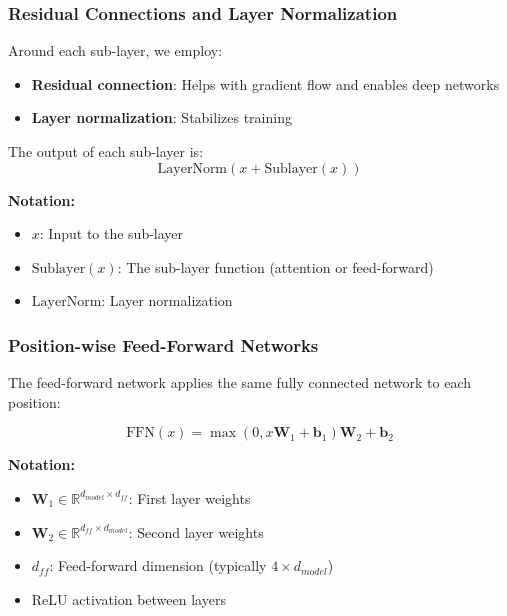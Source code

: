 \subsubsection{Residual Connections and Layer Normalization}

Around each sub-layer, we employ:
\begin{itemize}
    \item \textbf{Residual connection}: Helps with gradient flow and enables deep networks
    \item \textbf{Layer normalization}: Stabilizes training
\end{itemize}

The output of each sub-layer is:
\begin{equation}
\text{LayerNorm}(x + \text{Sublayer}(x))
\end{equation}
\begin{notationbox}
\textbf{Notation:}
\begin{itemize}
    \item $x$: Input to the sub-layer
    \item $\text{Sublayer}(x)$: The sub-layer function (attention or feed-forward)
    \item $\text{LayerNorm}$: Layer normalization
\end{itemize}
\end{notationbox}

\subsubsection{Position-wise Feed-Forward Networks}

The feed-forward network applies the same fully connected network to each position:

\begin{equation}
\text{FFN}(x) = \max(0, x\mathbf{W}_1 + \mathbf{b}_1)\mathbf{W}_2 + \mathbf{b}_2
\end{equation}
\begin{notationbox}
\textbf{Notation:}
\begin{itemize}
    \item $\mathbf{W}_1 \in \mathbb{R}^{d_{model} \times d_{ff}}$: First layer weights
    \item $\mathbf{W}_2 \in \mathbb{R}^{d_{ff} \times d_{model}}$: Second layer weights
    \item $d_{ff}$: Feed-forward dimension (typically $4 \times d_{model}$)
    \item ReLU activation between layers
\end{itemize}
\end{notationbox}

